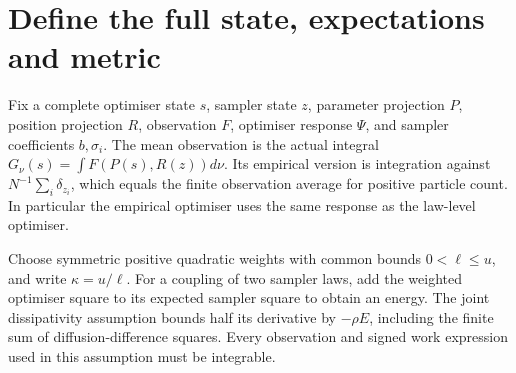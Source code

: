 \documentclass[11pt,a4paper]{report}
\begin{document}
\section{\texorpdfstring{Define the full state, expectations and metric}{Define the full state, expectations and metric}}


Fix a complete optimiser state \(s\), sampler state \(z\), parameter projection \(P\), position projection \(R\), observation \(F\), optimiser response \(\Psi\), and sampler coefficients \(b,\sigma_i\). The mean observation is the actual integral \(G_\nu(s)=\int F(P(s),R(z))d\nu\). Its empirical version is integration against \(N^{-1}\sum_i\delta_{z_i}\), which equals the finite observation average for positive particle count. In particular the empirical optimiser uses the same response as the law-level optimiser.



Choose symmetric positive quadratic weights with common bounds \(0<\ell\le u\), and write \(\kappa=u/\ell\). For a coupling of two sampler laws, add the weighted optimiser square to its expected sampler square to obtain an energy. The joint dissipativity assumption bounds half its derivative by \(-\rho E\), including the finite sum of diffusion-difference squares. Every observation and signed work expression used in this assumption must be integrable.
\end{document}
